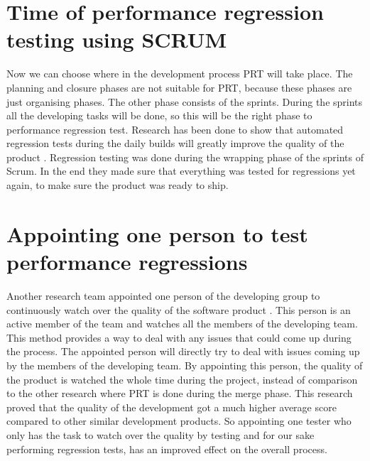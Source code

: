 \section{Time of performance regression testing using SCRUM} Now we can choose where in the development process PRT will take place. The planning and closure phases are not suitable for PRT, because these phases are just organising phases. The other phase consists of the sprints. During the sprints all the developing tasks will be done, so this will be the right phase to performance regression test. Research has been done to show that automated regression tests during the daily builds will greatly improve the quality of the product \cite{Future_of_Scrum}. Regression testing was done during the wrapping phase of the sprints of Scrum. In the end they made sure that everything was tested for regressions yet again, to make sure the product was ready to ship.

\section{Appointing one person to test performance regressions} Another research team appointed one person of the developing group to continuously watch over the quality of the software product \cite{Fully_Distributed_Scrum}. This person is an active member of the team and watches all the members of the developing team. This method provides a way to deal with any issues that could come up during the process. The appointed person will directly try to deal with issues coming up by the members of the developing team. By appointing this person, the quality of the product is watched the whole time during the project, instead of comparison to the other research where PRT is done during the merge phase. This research proved that the quality of the development got a much higher average score compared to other similar development products. So appointing one tester who only has the task to watch over the quality by testing and for our sake performing regression tests, has an improved effect on the overall process.

\section{}

